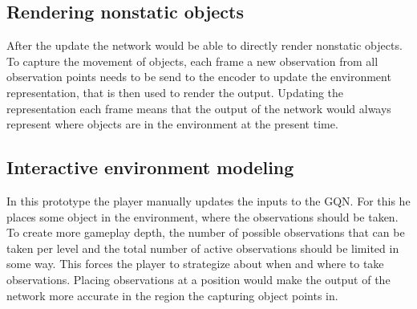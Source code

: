 \subsection{Rendering nonstatic objects}
After the update the network would be able to directly render nonstatic objects. To capture the movement of objects, each frame a new observation from all observation points needs to be send to the encoder to update the environment representation, that is then used to render the output. Updating the representation each frame means that the output of the network would always represent where objects are in the environment at the present time.


\newpage
\subsection{Interactive environment modeling}\label{PlayerEnvironmentModeling}
In this prototype the player manually updates the inputs to the GQN. For this he places some object in the environment, where the observations should be taken. To create more gameplay depth, the number of possible observations that can be taken per level and the total number of active observations should be limited in some way. This forces the player to strategize about when and where to take observations. Placing observations at a position would make the output of the network more accurate in the region the capturing object points in.
